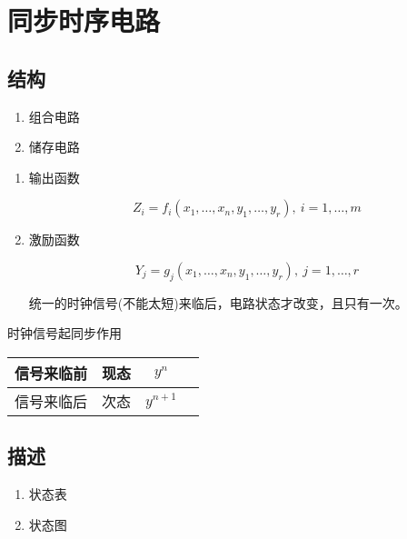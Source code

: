 \chapter{同步时序电路}
\newpage

\section{结构}

\begin{enumerate}

    \item 组合电路
    \item 储存电路

\end{enumerate}

\begin{enumerate}

\item 输出函数

\begin{equation}
    Z_i=f_i(x_1,\dots,x_n,y_1,\dots,y_r),~i=1,\dots,m
\end{equation}

\item 激励函数

\begin{equation}
    Y_j=g_j(x_1,\dots,x_n,y_1,\dots,y_r),~j=1,\dots,r
\end{equation}

统一的时钟信号(不能太短)来临后，电路状态才改变，且只有一次。

\end{enumerate}

\newpage

时钟信号起同步作用

\begin{table}[!htbp]
    \centering
    \begin{tabular}{lccc}
        \toprule
        信号来临前 & 现态 & $y^{n}$   \\
        \midrule
        信号来临后 & 次态 & $y^{n+1}$ \\
        \bottomrule
    \end{tabular}
\end{table}

\section{描述}

\begin{enumerate}
    \item 状态表
    \item 状态图
\end{enumerate}

